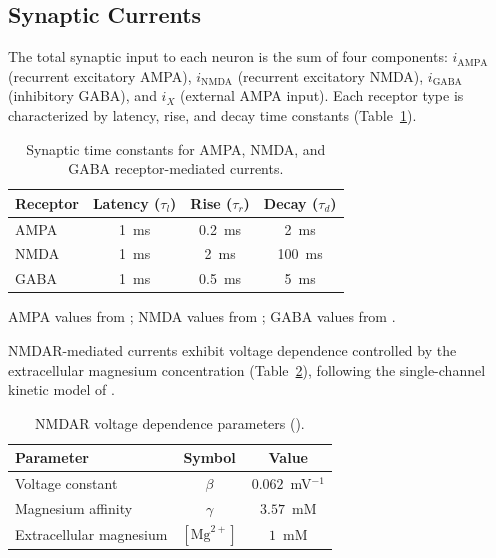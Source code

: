 \documentclass[10pt]{article}
\begin{document}
\subsection{Synaptic Currents}

The total synaptic input to each neuron is the sum of four components:
$i_{\text{AMPA}}$ (recurrent excitatory AMPA), $i_{\text{NMDA}}$ (recurrent
excitatory NMDA), $i_{\text{GABA}}$ (inhibitory GABA), and $i_X$ (external AMPA
input). Each receptor type is characterized by latency, rise, and decay time
constants (Table~\ref{tab:synaptic_params}).

\begin{table}[htbp]
\centering
\caption{Synaptic time constants for AMPA, NMDA, and GABA receptor-mediated currents.}
\label{tab:synaptic_params}
\begin{tabular}{lccc}
\toprule
Receptor & Latency ($\tau_l$) & Rise ($\tau_r$) & Decay ($\tau_d$) \\
\midrule
AMPA & 1~ms & 0.2~ms & 2~ms \\
NMDA & 1~ms & 2~ms & 100~ms \\
GABA & 1~ms & 0.5~ms & 5~ms \\
\bottomrule
\end{tabular}
\begin{flushleft}
\footnotesize{AMPA values from \citet{zhou1998ampa}; NMDA values from
\citet{hestrin1990analysis}; GABA values from \citet{gupta2000organizing}.}
\end{flushleft}
\end{table}

NMDAR-mediated currents exhibit voltage dependence controlled by the
extracellular magnesium concentration (Table~\ref{tab:nmdar_params}), following
the single-channel kinetic model of \citet{jahr1990voltage}.

\begin{table}[htbp]
\centering
\caption{NMDAR voltage dependence parameters (\citet{jahr1990voltage}).}
\label{tab:nmdar_params}
\begin{tabular}{lcc}
\toprule
Parameter & Symbol & Value \\
\midrule
Voltage constant & $\beta$ & $0.062$~mV$^{-1}$ \\
Magnesium affinity & $\gamma$ & $3.57$~mM \\
Extracellular magnesium & $[\text{Mg}^{2+}]$ & $1$~mM \\
\bottomrule
\end{tabular}
\end{table}
\end{document}
